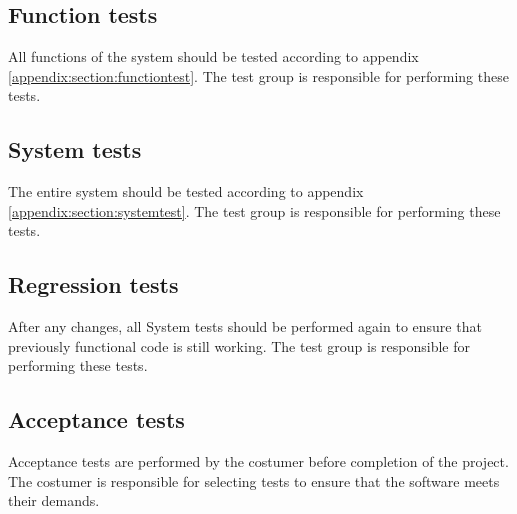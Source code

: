 \documentclass[a4paper]{article}
\begin{document}
\subsection{Function tests}
All functions of the system should be tested according to appendix \ref{appendix:section:functiontest}. The test group is responsible for  performing these tests.

\subsection{System tests}
The entire system should be tested according to appendix \ref{appendix:section:systemtest}. The test group is responsible for performing these tests. 

\subsection{Regression tests}
After any changes, all System tests should be performed again to ensure that previously functional code is still working. The test group is responsible for performing these tests.

\subsection{Acceptance tests}
Acceptance tests are performed by the costumer before completion of the project. The costumer is responsible for selecting tests to ensure that the software meets their demands.
\end{document}
